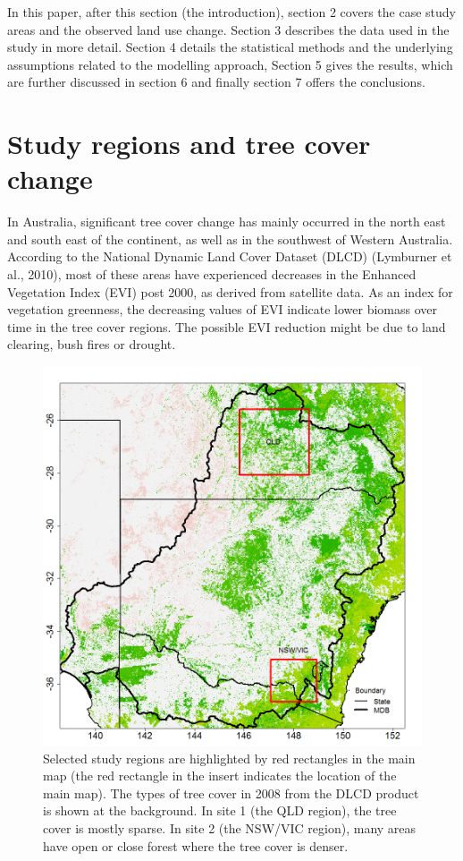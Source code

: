 \documentclass[fleqn,10pt,lineno]{wlpeerj} %
\theoremstyle{definition}
\theoremstyle{definition}
\theoremstyle{definition}
\theoremstyle{remark}
\begin{document}
In this paper, after this section (the introduction), section 2 covers
the case study areas and the observed land use change. Section 3
describes the data used in the study in more detail. Section 4 details
the statistical methods and the underlying assumptions related to the
modelling approach, Section 5 gives the results, which are further
discussed in section 6 and finally section 7 offers the conclusions.

\section{Study regions and tree cover
change}\label{study-regions-and-tree-cover-change}

In Australia, significant tree cover change has mainly occurred in the
north east and south east of the continent, as well as in the southwest
of Western Australia. According to the National Dynamic Land Cover
Dataset (DLCD) (Lymburner et al., 2010), most of these areas have
experienced decreases in the Enhanced Vegetation Index (EVI) post 2000,
as derived from satellite data. As an index for vegetation greenness,
the decreasing values of EVI indicate lower biomass over time in the
tree cover regions. The possible EVI reduction might be due to land
clearing, bush fires or drought.

\begin{figure}
\includegraphics[width=0.9\linewidth]{figures/map_selreg} \caption{Selected study regions are highlighted by red rectangles in the main map (the red rectangle in the insert indicates the location of the main map). The types of tree cover in 2008 from the DLCD product is shown at the background. In site 1 (the QLD region), the tree cover is mostly sparse. In site 2 (the NSW/VIC region), many areas have open or close forest where the tree cover is denser.}\label{fig:selreg}
\end{figure}
\end{document}
